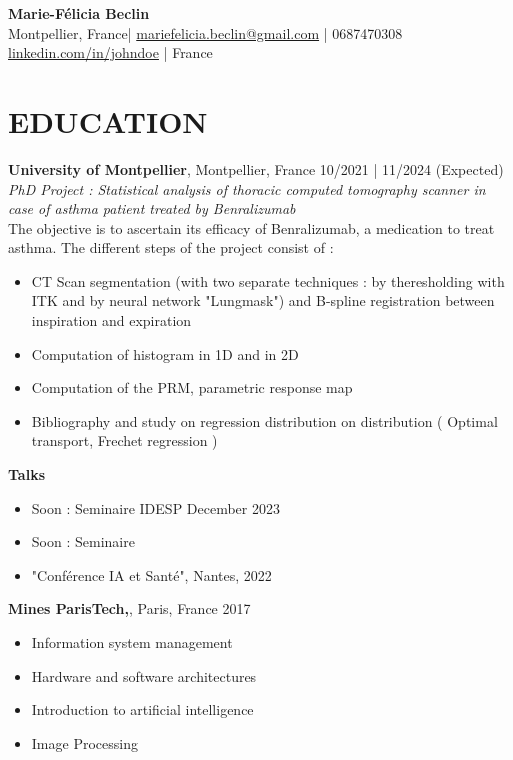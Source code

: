 \documentclass[a4paper,9pt]{extarticle}
\begin{document}
\pagestyle{empty}

\begin{center}
\textbf{\Large Marie-Félicia Beclin}\\[2pt] %
Montpellier, France| \href{mailto:mariefelicia.beclin@gmail.com}{mariefelicia.beclin@gmail.com} | 0687470308  \href{https://www.linkedin.com/in/johndoe}{linkedin.com/in/johndoe} | France %

\end{center}

\section*{EDUCATION}
\noindent
\textbf{University of Montpellier}, Montpellier, France \hfill  10/2021 | 11/2024 (Expected)\\ %
\textit{PhD Project : Statistical analysis of thoracic computed tomography scanner in case of asthma patient treated by Benralizumab }\\

The objective is to ascertain its efficacy of Benralizumab, a medication to treat asthma. The different steps of the project consist of :
\begin{itemize}
    \item CT Scan segmentation (with two separate techniques : by theresholding with ITK and by neural network "Lungmask") and B-spline registration between inspiration and expiration 
    \item Computation of histogram in 1D and in 2D 
    \item Computation of the PRM, parametric response map
    \item Bibliography and study on regression distribution on distribution ( Optimal transport, Frechet regression )  
\end{itemize}

\textbf{Talks}
\begin{itemize}
\item Soon :  Seminaire IDESP December 2023
\item Soon : Seminaire 
\item "Conférence IA et Santé", Nantes, 2022
\end{itemize}



\noindent
\textbf{Mines ParisTech,}, Paris, France \hfill 2017 
\begin{itemize}
\item Information system management
\item Hardware and software architectures
\item Introduction to artificial intelligence
\item Image Processing
\end{itemize}\\
\end{document}
